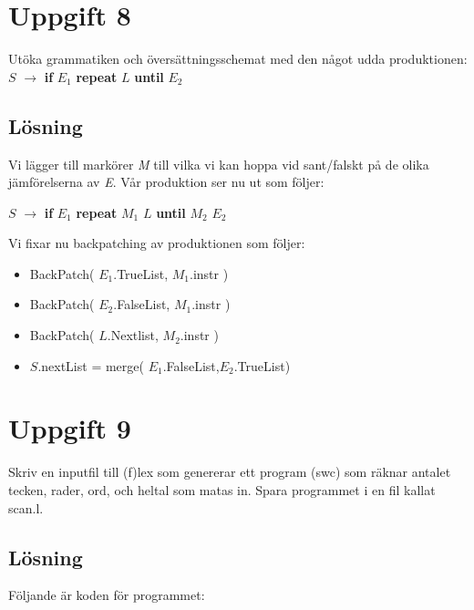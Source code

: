 \documentclass[10pt, titlepage, oneside, a4paper]{article}
\newcommand{\Section}[1]{\section{#1}\vspace{-4pt}}
\begin{document}
		
		\pagebreak
		
		\Section{ Uppgift 8 }	
		
		Utöka grammatiken och översättningsschemat med den något udda produktionen: $S$ $\to$ \textbf{if} $E_1$ \textbf{repeat} $L$ \textbf{until} $E_2 $
		
		\subsection{Lösning}
		
		Vi lägger till markörer \textit{M} till vilka vi kan hoppa vid sant/falskt på de olika jämförelserna av \textit{E}. Vår produktion ser nu ut som följer:
		
		$S$ $\to$ \textbf{if} $E_1$ \textbf{repeat} $M_1$ $L$ \textbf{until} $M_2$ $E_2 $
		
		Vi fixar nu backpatching av produktionen som följer:
		
		\begin{itemize}
		
		\item BackPatch( $E_1$.TrueList, $M_1$.instr )

		\item BackPatch( $E_2$.FalseList, $M_1$.instr )	
		\item BackPatch( $L$.Nextlist, $M_2$.instr )
		 
		\item $S$.nextList = merge( $E_1$.FalseList,$E_2$.TrueList) 
		
		\end{itemize}
		
		\pagebreak
		
		\Section{ Uppgift 9 }
		
	Skriv en inputfil till (f)lex som genererar ett program (swc) som räknar antalet tecken, rader, ord, och heltal som matas in. Spara programmet i en fil kallat scan.l.
	
	\subsection{Lösning}	
	
Följande är koden för programmet:
\end{document}
